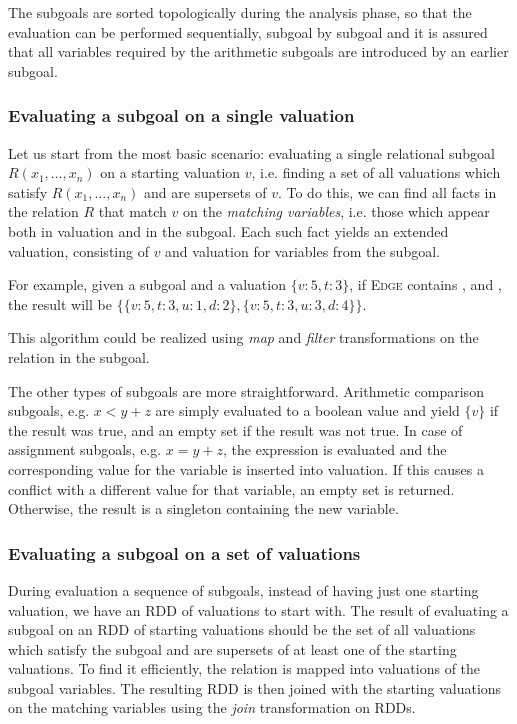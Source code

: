 The subgoals are sorted topologically during the analysis phase, so that the evaluation can be performed sequentially, subgoal by subgoal and it is assured that all variables required by the arithmetic subgoals are introduced by an earlier subgoal.

\subsubsection{Evaluating a subgoal on a single valuation}
Let us start from the most basic scenario: evaluating a single relational subgoal $R(x_1, \dots, x_n)$ on a starting valuation $v$, i.e. finding a set of all valuations which satisfy $R(x_1, \dots, x_n)$ and are supersets of $v$. To do this, we can find all facts in the relation $R$ that match $v$ on the \emph{matching variables}, i.e. those which appear both in valuation and in the subgoal. Each such fact yields an extended valuation, consisting of $v$ and valuation for variables from the subgoal.

For example, given a subgoal  and a valuation $\{v: 5, t: 3\}$, if \textsc{Edge}  contains ,  and , the result will be $\{\{v: 5, t: 3, u: 1, d: 2\}, \{v: 5, t: 3, u: 3, d: 4\}\}$.

This algorithm could be realized using \emph{map} and \emph{filter} transformations on the relation in the subgoal.

The other types of subgoals are more straightforward. Arithmetic comparison subgoals, e.g. $x < y + z$ are simply evaluated to a boolean value and yield $\{v\}$ if the result was true, and an empty set if the result was not true. In case of assignment subgoals, e.g. $x = y + z$, the expression is evaluated and the corresponding value for the variable is inserted into valuation. If this causes a conflict with a different value for that variable, an empty set is returned. Otherwise, the result is a singleton containing the new variable.

\subsubsection{Evaluating a subgoal on a set of valuations}
During evaluation a sequence of subgoals, instead of having just one starting valuation, we have an RDD of valuations to start with. The result of evaluating a subgoal on an RDD of starting valuations should be the set of all valuations which satisfy the subgoal and are supersets of at least one of the starting valuations. To find it efficiently, the relation is mapped into valuations of the subgoal variables. The resulting RDD is then joined with the starting valuations on the matching variables using the \emph{join} transformation on RDDs.


